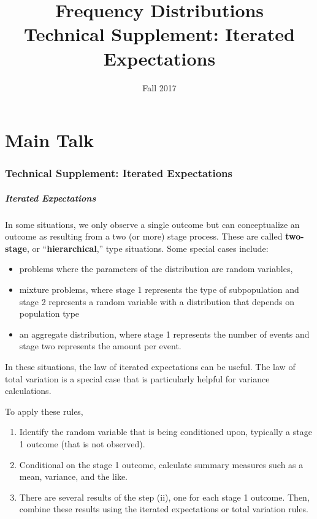 \documentclass{beamer}
\title[Tech Supplement]{Frequency Distributions \\
Technical Supplement: Iterated Expectations}
\date[Fall 2017]{Fall 2017}
\begin{document}
\frame{\titlepage}


\part<presentation>{Main Talk}



\section{Technical Supplement: Iterated Expectations}

\begin{frame}[shrink=2]
 \frametitle{Iterated Expectations}
 In some situations, we only observe a single outcome but can conceptualize an outcome as resulting from a two (or more) stage process. These are called \textbf{two-stage}, or ``\textbf{hierarchical},'' type situations. Some special cases include:
\begin{itemize}
\item problems where the parameters of the distribution are random variables,
\item mixture problems, where stage 1 represents the type of subpopulation and stage 2 represents a random variable with a distribution that depends on population type
\item an aggregate distribution, where stage 1 represents the number of events and stage two represents the amount per event.
\end{itemize}
In these situations, the law of iterated expectations can be useful. The law of total variation is a special case that is particularly helpful for variance calculations.

To apply these rules,
\begin{enumerate}
   \item Identify the random variable that is being conditioned upon, typically a stage 1 outcome (that is not observed).
\item Conditional on the stage 1 outcome, calculate summary measures such as a mean, variance, and the like.
\item There are several results of the step (ii), one for each stage 1 outcome. Then, combine these results using the iterated expectations or total variation rules.
\end{enumerate}  
\end{frame}
\end{document}
